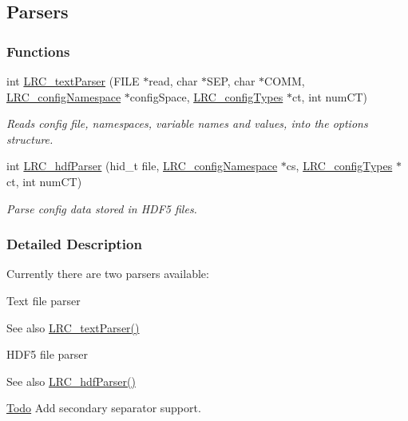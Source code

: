 \hypertarget{group___l_r_c__parser}{
\subsection{Parsers}
\label{group___l_r_c__parser}
}
\subsubsection*{Functions}
\begin{DoxyCompactItemize}
\item 
int \hyperlink{group___l_r_c__parser_ga4b1c98d54591fd4d05cc1caee09cbd35}{LRC\_\-textParser} (FILE $\ast$read, char $\ast$SEP, char $\ast$COMM, \hyperlink{struct_l_r_c__config_namespace}{LRC\_\-configNamespace} $\ast$configSpace, \hyperlink{struct_l_r_c__config_types}{LRC\_\-configTypes} $\ast$ct, int numCT)
\begin{DoxyCompactList}\small\item\em Reads config file, namespaces, variable names and values, into the options structure. \item\end{DoxyCompactList}\item 
int \hyperlink{group___l_r_c__parser_ga3cbf6e172a98da00ec8fd0b301b4b8f9}{LRC\_\-hdfParser} (hid\_\-t file, \hyperlink{struct_l_r_c__config_namespace}{LRC\_\-configNamespace} $\ast$cs, \hyperlink{struct_l_r_c__config_types}{LRC\_\-configTypes} $\ast$ct, int numCT)
\begin{DoxyCompactList}\small\item\em Parse config data stored in HDF5 files. \item\end{DoxyCompactList}\end{DoxyCompactItemize}


\subsubsection{Detailed Description}
Currently there are two parsers available:
\begin{DoxyItemize}
\item Text file parser \begin{DoxySeeAlso}{See also}
\hyperlink{group___l_r_c__parser_ga4b1c98d54591fd4d05cc1caee09cbd35}{LRC\_\-textParser()}
\end{DoxySeeAlso}

\item HDF5 file parser \begin{DoxySeeAlso}{See also}
\hyperlink{group___l_r_c__parser_ga3cbf6e172a98da00ec8fd0b301b4b8f9}{LRC\_\-hdfParser()}
\end{DoxySeeAlso}
\begin{Desc}
\item[\hyperlink{todo__todo000003}{Todo}]Add secondary separator support. \end{Desc}

\end{DoxyItemize}

